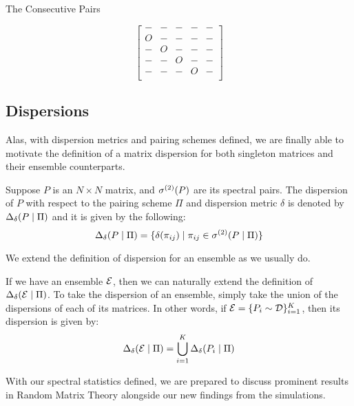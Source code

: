 The Consecutive Pairs 

$$
\begin{bmatrix}
- & - & - & - & -\\
O & - & - & - & -\\
- & O & - & - & -\\
- & - & O & - & -\\
- & - & - & O & -\\
\end{bmatrix}
$$

\newpage


\subsection{Dispersions}

Alas, with dispersion metrics and pairing schemes defined, we are finally able to motivate the definition of a matrix dispersion for both singleton matrices and their ensemble counterparts. 

\begin{definition}[Dispersion]
Suppose $P$ is an $N \times N$ matrix, and ${\sigma^{(2)}}(P)$ are its spectral pairs. The dispersion of $P$ with respect to the pairing scheme $\Pi$ and dispersion metric $\delta$ is denoted by $\Delta_\delta(P \mid \Pi)$ and it is given by the following:
$$\Delta_\delta(P \mid \Pi) = \{\delta({\pi_{ij}}) \mid {\pi_{ij}} \in {\sigma^{(2)}}(P \mid \Pi)\}$$
\end{definition}

We extend the definition of dispersion for an ensemble as we usually do.

\begin{definition}
If we have an ensemble $\mathcal{E}$, then we can naturally extend the definition of $\Delta_\delta(\mathcal{E} \mid \Pi)$. To take the dispersion of an ensemble, simply take the union of the dispersions of each of its matrices. In other words, if $\mathcal{E} = \{P_i \sim \mathcal{D}\}_{i = 1}^K$, then its dispersion is given by:
$$\Delta_\delta(\mathcal{E} \mid \Pi) = \bigcup_{i=1}^K \Delta_\delta(P_i \mid \Pi)$$
\end{definition}
With our spectral statistics defined, we are prepared to discuss prominent results in Random Matrix Theory alongside our new findings from the simulations. 



